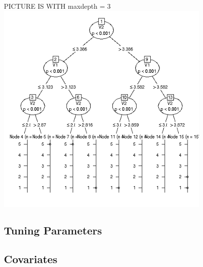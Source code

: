 PICTURE IS WITH maxdepth = 3
\includegraphics[width=4.2in]{Images/MLmaxdepth3.png}

\subsection{Tuning Parameters}

\subsection{Covariates}

